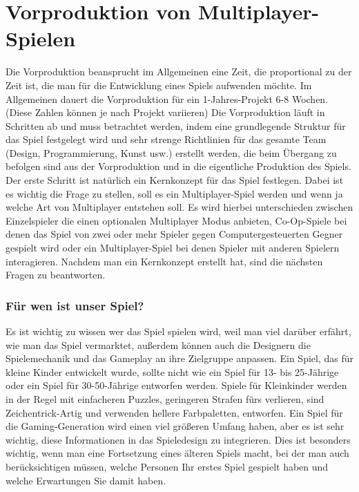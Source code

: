 \newpage
\section{Vorproduktion von Multiplayer-Spielen}
Die Vorproduktion beansprucht im Allgemeinen eine Zeit, die proportional zu der Zeit ist, die man für die Entwicklung eines Spiels aufwenden möchte. Im Allgemeinen dauert die Vorproduktion für ein 1-Jahres-Projekt 6-8 Wochen. (Diese Zahlen können je nach Projekt variieren)
\newline\noindent\newline
Die Vorproduktion läuft in Schritten ab und muss betrachtet werden, indem eine grundlegende Struktur für das Spiel festgelegt wird und sehr strenge Richtlinien für das gesamte Team (Design, Programmierung, Kunst  usw.) erstellt werden, die beim Übergang zu befolgen sind aus der Vorproduktion und in die eigentliche Produktion des Spiels.
\newline\noindent\newline
Der erste Schritt ist natürlich ein Kernkonzept für das Spiel festlegen. Dabei ist es wichtig die Frage zu stellen, soll es ein Multiplayer-Spiel werden und wenn ja welche Art von Multiplayer entstehen soll. Es wird hierbei unterschieden zwischen Einzelspieler die einen optionalen Multiplayer Modus anbieten, Co-Op-Spiele bei denen das Spiel von zwei oder mehr Spieler gegen Computergesteuerten Gegner gespielt wird oder ein Multiplayer-Spiel bei denen Spieler mit anderen Spielern interagieren. 
\newline\noindent\newline
Nachdem man ein Kernkonzept erstellt hat, sind die nächsten Fragen zu beantworten.
\subsubsection*{Für wen ist unser Spiel?}
Es ist wichtig zu wissen wer das Spiel spielen wird, weil man viel darüber erfährt, wie man das Spiel vermarktet, außerdem können auch die Designern die Spielemechanik und das Gameplay an ihre Zielgruppe anpassen. Ein Spiel, das für kleine Kinder entwickelt wurde, sollte nicht wie ein Spiel für 13- bis 25-Jährige oder ein Spiel für 30-50-Jährige entworfen werden. Spiele für Kleinkinder werden in der Regel mit einfacheren Puzzles, geringeren Strafen fürs verlieren, sind Zeichentrick-Artig und verwenden hellere Farbpaletten, entworfen.
\newline\noindent\newline
Ein Spiel für die \grqq Gaming\grqq-Generation wird einen viel größeren Umfang haben, aber es ist sehr wichtig, diese Informationen in das Spieledesign zu integrieren. Dies ist besonders wichtig, wenn man eine Fortsetzung eines älteren Spiels macht, bei der man auch berücksichtigen müssen, welche Personen Ihr erstes Spiel gespielt haben und welche Erwartungen Sie damit haben.
